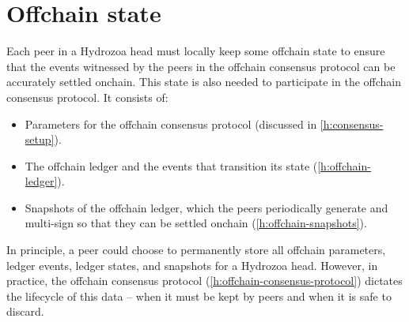 \documentclass[../hydrozoa.tex]{subfiles}
\begin{document}
\chapter{Offchain state}%
\label{h:offchain-state}

Each peer in a Hydrozoa head must locally keep some offchain state to ensure that the events witnessed by the peers in the offchain consensus protocol can be accurately settled onchain.
This state is also needed to participate in the offchain consensus protocol.
It consists of:
\begin{itemize}
  \item Parameters for the offchain consensus protocol (discussed in \cref{h:consensus-setup}).
  \item The offchain ledger and the events that transition its state (\cref{h:offchain-ledger}).
  \item Snapshots of the offchain ledger, which the peers periodically generate and multi-sign so that they can be settled onchain (\cref{h:offchain-snapshots}).
\end{itemize}

In principle, a peer could choose to permanently store all offchain parameters, ledger events, ledger states, and snapshots for a Hydrozoa head.
However, in practice, the offchain consensus protocol (\cref{h:offchain-consensus-protocol}) dictates the lifecycle of this data -- when it must be kept by peers and when it is safe to discard.
\end{document}
